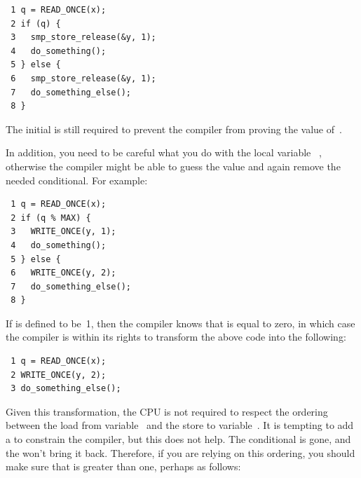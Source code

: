 \vspace{5pt}
\begin{minipage}[t]{\columnwidth}
\scriptsize
\begin{verbatim}
 1 q = READ_ONCE(x);
 2 if (q) {
 3   smp_store_release(&y, 1);
 4   do_something();
 5 } else {
 6   smp_store_release(&y, 1);
 7   do_something_else();
 8 }
\end{verbatim}
\end{minipage}
\vspace{5pt}

The initial  is still required to prevent the compiler from
proving the value of~.

In addition, you need to be careful what you do with the local variable~%
,
otherwise the compiler might be able to guess the value and again remove
the needed conditional.
For example:

\vspace{5pt}
\begin{minipage}[t]{\columnwidth}
\scriptsize
\begin{verbatim}
 1 q = READ_ONCE(x);
 2 if (q % MAX) {
 3   WRITE_ONCE(y, 1);
 4   do_something();
 5 } else {
 6   WRITE_ONCE(y, 2);
 7   do_something_else();
 8 }
\end{verbatim}
\end{minipage}
\vspace{5pt}

If  is defined to be~1, then the compiler knows that  is
equal to zero, in which case the compiler is within its rights to
transform the above code into the following:

\vspace{5pt}
\begin{minipage}[t]{\columnwidth}
\scriptsize
\begin{verbatim}
 1 q = READ_ONCE(x);
 2 WRITE_ONCE(y, 2);
 3 do_something_else();
\end{verbatim}
\end{minipage}
\vspace{5pt}

Given this transformation, the CPU is not required to respect the ordering
between the load from variable~ and the store to variable~.
It is tempting to add a  to constrain the compiler,
but this does not help.
The conditional is gone, and the  won't bring it back.
Therefore, if you are relying on this ordering, you should make sure
that  is greater than one, perhaps as follows:

